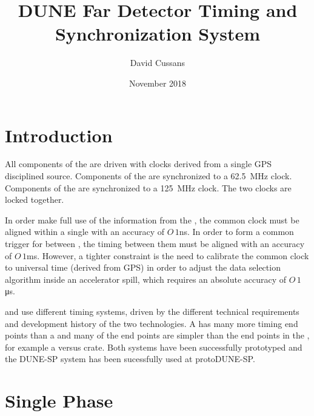 \documentclass[final]{dune}
\title{DUNE Far Detector Timing and Synchronization System}
\author{David Cussans }
\date{November 2018}
\begin{document}
\maketitle

\section{Introduction}




All components of the  are driven with clocks derived from a single GPS disciplined source. Components of the  are
synchronized to a \SI{62.5}{\MHz} clock. Components of the  are synchronized to a \SI{125}{\MHz} clock. The two clocks are locked together.

In order make full use of the
information from the , the common clock must be
aligned within a single  with an accuracy of $O\,1$\si{ns}.
In order to form a common trigger for  between
, the timing between them must be aligned with an
accuracy of $O\,1$\si{ms}.  However, a tighter constraint is the need to
calibrate the common clock to universal time (derived from GPS) in
order to adjust the data selection algorithm inside an accelerator
spill, which requires an absolute accuracy of $O\,1$\si{\micro\s}.

\single and \dual {} use different timing systems,
driven by the different technical requirements and development history
of the two technologies. %
A  has many more
timing end points than a  and many of the end points
are simpler than the end points in the \dual{}, for example a 
versus  crate. Both systems have been successfully prototyped and the DUNE-SP system has been sucessfully used at protoDUNE-SP.

\section{Single Phase}
\end{document}
